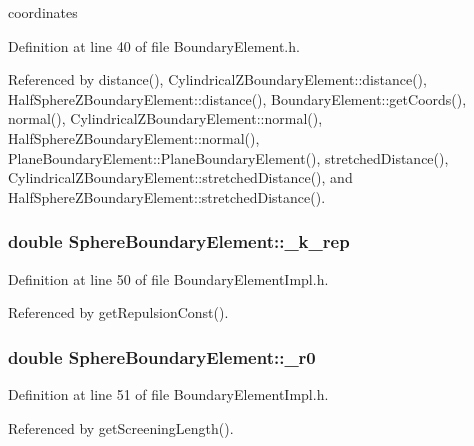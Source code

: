 coordinates 



Definition at line 40 of file Boundary\+Element.\+h.



Referenced by distance(), Cylindrical\+Z\+Boundary\+Element\+::distance(), Half\+Sphere\+Z\+Boundary\+Element\+::distance(), Boundary\+Element\+::get\+Coords(), normal(), Cylindrical\+Z\+Boundary\+Element\+::normal(), Half\+Sphere\+Z\+Boundary\+Element\+::normal(), Plane\+Boundary\+Element\+::\+Plane\+Boundary\+Element(), stretched\+Distance(), Cylindrical\+Z\+Boundary\+Element\+::stretched\+Distance(), and Half\+Sphere\+Z\+Boundary\+Element\+::stretched\+Distance().

\hypertarget{classSphereBoundaryElement_a4bca6baf26a3fb1718aaaed348646a58}{
\subsubsection[{\+\_\+k\+\_\+rep}]{\setlength{\rightskip}{0pt plus 5cm}double Sphere\+Boundary\+Element\+::\+\_\+k\+\_\+rep\hspace{0.3cm}{\ttfamily [private]}}}\label{classSphereBoundaryElement_a4bca6baf26a3fb1718aaaed348646a58}


Definition at line 50 of file Boundary\+Element\+Impl.\+h.



Referenced by get\+Repulsion\+Const().

\hypertarget{classSphereBoundaryElement_a3e80ad9724c8ae7ff03631b4f2f84d1b}{
\subsubsection[{\+\_\+r0}]{\setlength{\rightskip}{0pt plus 5cm}double Sphere\+Boundary\+Element\+::\+\_\+r0\hspace{0.3cm}{\ttfamily [private]}}}\label{classSphereBoundaryElement_a3e80ad9724c8ae7ff03631b4f2f84d1b}


Definition at line 51 of file Boundary\+Element\+Impl.\+h.



Referenced by get\+Screening\+Length().

